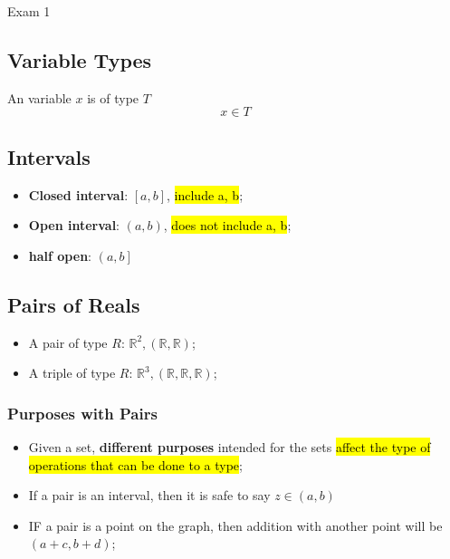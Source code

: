 \documentclass{note}
\begin{document}
\begin{note}{Exam 1}
        \subsection{Variable Types}
        An variable $ x $ is of type $ T $
        \begin{equation}\label{eq: var type}
            x \in T
        \end{equation}

        \subsection{Intervals}
        \begin{itemize}
            \item \textbf{Closed interval}: $ \left[a, b\right] $, \hl{include a, b};
            \item \textbf{Open interval}: $ \left(a, b\right) $, \hl{does not include a, b};
            \item \textbf{half open}: $ \left(a, b\right] $
        \end{itemize}

        \subsection{Pairs of Reals}\label{sec: pairs}

        \begin{itemize}
            \item A pair of type $ R $: $ \mathbb{R}^{2}, (\mathbb{R}, \mathbb{R}) $;
            \item A triple of type $ R $: $ \mathbb{R}^{3}, (\mathbb{R}, \mathbb{R}, \mathbb{R}) $;
        \end{itemize}

        \subsubsection{Purposes with Pairs}
        \begin{itemize}
            \item Given a set, \textbf{different purposes} intended for the sets \hl{affect the type of operations
            that can be done to a type};
            \item If a pair is an interval, then it is safe to say $ z \in \left(a, b\right) $
            \item IF a pair is a point on the graph, then addition with another point will be 
            $ \left(a + c, b + d\right) $;
        \end{itemize}


\end{note}
\end{document}
